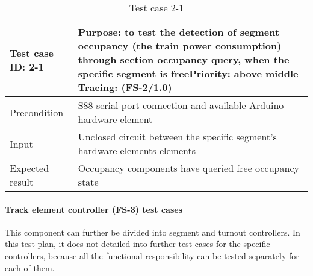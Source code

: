 \begin{table}[H]
	\caption{Test case 2-1}
	\label{table:TCase-FS2-01}
	\begin{center}
		\renewcommand{\arraystretch}{1.8}
		\begin{tabu} 
			to 0.9 \textwidth
			{  X[0.4, c] X[c] }
			\toprule
			Test case ID: 2-1 & Purpose: to test the detection of segment occupancy (the train power consumption) through section occupancy query, when the specific segment is free\newline Priority: above middle \newline Tracing: (FS-2/1.0) \\ \midrule
			Precondition      & S88 serial port connection and available Arduino hardware element                                                                                                                                                \\
			Input             & Unclosed circuit between the specific segment's hardware elements elements                                                                                                                                       \\
			Expected result   & Occupancy components have queried free occupancy state                                                                                                                                                           \\ \bottomrule
		\end{tabu}
	\end{center}
\end{table} 

\paragraph{Track element controller (FS-3)  test cases} This component can further be divided into segment and turnout controllers. In this test plan, it does not detailed into further test cases for the specific controllers, because all the functional responsibility can be tested separately for each of them.

